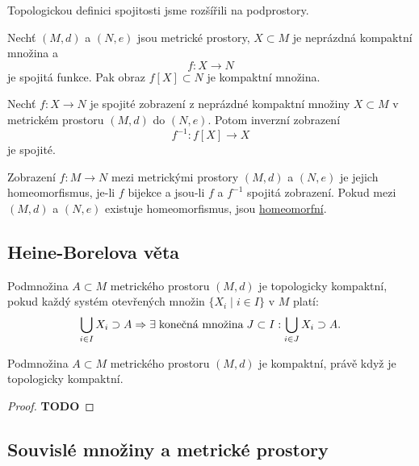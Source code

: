 \documentclass[../main.tex]{subfiles}
\begin{document}
\noindent
Topologickou definici spojitosti jsme rozšířili na podprostory.

\begin{lemma}
    Nechť $(M,d)$ a $(N,e)$ jsou metrické prostory, $X\subset M$ je neprázdná kompaktní množina a \[ f: X\to N \] je spojitá funkce.
    Pak obraz $f[X] \subset N$ je kompaktní množina.
\end{lemma}

\begin{lemma}
    Nechť $f: X\to N$ je spojité zobrazení z neprázdné kompaktní množiny $X \subset M$ v metrickém prostoru $(M,d)$ do $(N,e)$.
    Potom inverzní zobrazení \[ f^{-1}: f[X] \to X \] je spojité.
\end{lemma}

\begin{definition}[Homeomorfismus]
    Zobrazení $f: M\to N$ mezi metrickými prostory $(M,d)$ a $(N,e)$ je jejich homeomorfismus, je-li $f$ bijekce a jsou-li $f$ a $f^{-1}$ spojitá zobrazení.
    Pokud mezi $(M,d)$ a $(N,e)$ existuje homeomorfismus, jsou \underline{homeomorfní}.
\end{definition}

\subsection{Heine-Borelova věta}

\begin{definition}
    Podmnožina $A\subset M$ metrického prostoru $(M,d)$ je topologicky kompaktní, pokud každý systém otevřených množin $\{ X_i \mid i \in I \}$ v $M$ platí:
    \[ \bigcup_{i \in I} X_i \supset A \Rightarrow \exists \hspace{1mm} \text{konečná množina} \hspace{1mm} J \subset I: \bigcup_{i\in J}X_i \supset A. \]
\end{definition}

\begin{theorem}
    Podmnožina $A\subset M$ metrického prostoru $(M,d)$ je kompaktní, právě když je topologicky kompaktní.
\end{theorem}
\begin{proof}
    \LARGE
    \textbf{TODO}
\end{proof}

\subsection{Souvislé množiny a metrické prostory}
\end{document}
